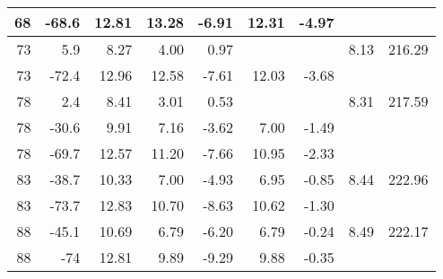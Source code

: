 \begin{table}[H]
\begin{tabular}{|r|r|r|r|r|r|r|r|r|}
            68 &      -68.6 &      12.81 &      13.28 &      -6.91 &      12.31 &      -4.97 &            &            \\
    \hline
            73 &        5.9 &       8.27 &       4.00 &       0.97 &            &            &       8.13 &     216.29 \\
    
            73 &      -72.4 &      12.96 &      12.58 &      -7.61 &      12.03 &      -3.68 &            &            \\
    \hline
            78 &        2.4 &       8.41 &       3.01 &       0.53 &            &            &       8.31 &     217.59 \\
    
            78 &      -30.6 &       9.91 &       7.16 &      -3.62 &       7.00 &      -1.49 &            &            \\
    
            78 &      -69.7 &      12.57 &      11.20 &      -7.66 &      10.95 &      -2.33 &            &            \\
    \hline
            83 &      -38.7 &      10.33 &       7.00 &      -4.93 &       6.95 &      -0.85 &       8.44 &     222.96 \\
    
            83 &      -73.7 &      12.83 &      10.70 &      -8.63 &      10.62 &      -1.30 &            &            \\
    \hline
            88 &      -45.1 &      10.69 &       6.79 &      -6.20 &       6.79 &      -0.24 &       8.49 &     222.17 \\
    
            88 &        -74 &      12.81 &       9.89 &      -9.29 &       9.88 &      -0.35 &            &            \\
    \hline
    \end{tabular} 
    \label{tab: erster Quadrant} 
\end{table}

